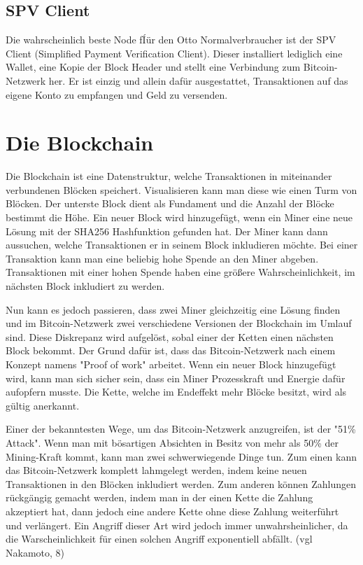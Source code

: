 \subsection{SPV Client}
Die wahrscheinlich beste Node fÍür den Otto Normalverbraucher ist der SPV Client (Simplified Payment Verification Client). Dieser
installiert lediglich eine Wallet, eine Kopie der Block Header und stellt eine Verbindung zum Bitcoin-Netzwerk her. Er ist einzig
und allein dafür ausgestattet, Transaktionen auf das eigene Konto zu empfangen und Geld zu versenden. 


\section{Die Blockchain}
Die Blockchain ist eine Datenstruktur, welche Transaktionen in miteinander verbundenen Blöcken speichert. Visualisieren kann man
diese wie einen Turm von Blöcken. Der unterste Block dient als Fundament und die Anzahl der Blöcke bestimmt die Höhe. Ein neuer
Block wird hinzugefügt, wenn ein Miner eine neue Lösung mit der SHA256 Hashfunktion gefunden hat. Der Miner kann dann aussuchen,
welche Transaktionen er in seinem Block inkludieren möchte. Bei einer Transaktion kann man eine beliebig hohe Spende an den Miner
abgeben. Transaktionen mit einer hohen Spende haben eine größere Wahrscheinlichkeit, im nächsten Block inkludiert zu werden.

Nun kann es jedoch passieren, dass zwei Miner gleichzeitig eine Lösung finden und im Bitcoin-Netzwerk zwei verschiedene Versionen
der Blockchain im Umlauf sind. Diese Diskrepanz wird aufgelöst, sobal einer der Ketten einen nächsten Block bekommt. Der Grund
dafür ist, dass das Bitcoin-Netzwerk nach einem Konzept namens "Proof of work" arbeitet. Wenn ein neuer Block hinzugefügt wird,
kann man sich sicher sein, dass ein Miner Prozesskraft und Energie dafür aufopfern musste. Die Kette, welche im Endeffekt mehr
Blöcke besitzt, wird als gültig anerkannt.

Einer der bekanntesten Wege, um das Bitcoin-Netzwerk anzugreifen, ist der "51\% Attack". Wenn man mit bösartigen Absichten
in Besitz von mehr als 50\% der Mining-Kraft kommt, kann man zwei schwerwiegende Dinge tun. Zum einen kann das Bitcoin-Netzwerk
komplett lahmgelegt werden, indem keine neuen Transaktionen in den Blöcken inkludiert werden. Zum anderen können Zahlungen
rückgängig gemacht werden, indem man in der einen Kette die Zahlung akzeptiert hat, dann jedoch eine andere Kette ohne diese 
Zahlung weiterführt und verlängert. Ein Angriff dieser Art wird jedoch immer unwahrsheinlicher, da die Warscheinlichkeit für
einen solchen Angriff exponentiell abfällt. (vgl Nakamoto, 8)

